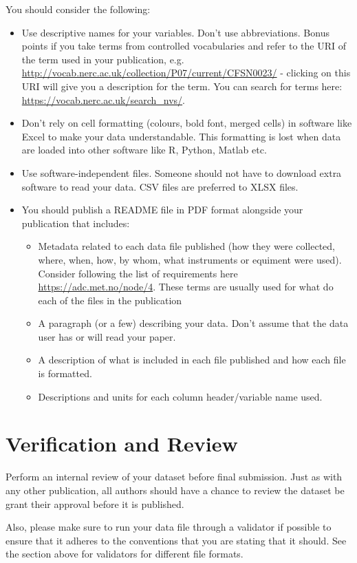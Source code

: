 \documentclass[a4paper,12pt]{article}
\begin{document}
You should consider the following:
\begin{itemize}
\item Use descriptive names for your variables. Don't use abbreviations. Bonus points if you take terms from controlled vocabularies and refer to the URI of the term used in your publication, e.g. \url{http://vocab.nerc.ac.uk/collection/P07/current/CFSN0023/} - clicking on this URI will give you a description for the term. You can search for terms here: \url{https://vocab.nerc.ac.uk/search_nvs/}.
\item Don't rely on cell formatting (colours, bold font, merged cells) in software like Excel to make your data understandable. This formatting is lost when data are loaded into other software like R, Python, Matlab etc.
\item Use software-independent files. Someone should not have to download extra software to read your data. CSV files are preferred to XLSX files.
\item You should publish a README file in PDF format alongside your publication that includes:
\begin{itemize}
\item Metadata related to each data file published (how they were collected, where, when, how, by whom, what instruments or equiment were used). Consider following the list of requirements here \url{https://adc.met.no/node/4}. These terms are usually used for  what do each of the files in the publication 
\item A paragraph (or a few) describing your data. Don't assume that the data user has or will read your paper.
\item A description of what is included in each file published and how each file is formatted.
\item Descriptions and units for each column header/variable name used.
\end{itemize} 
\end{itemize}

\section{Verification and Review}
\label{sec:verification-review}

Perform an internal review of your dataset before final submission. Just as with any other publication, all authors should have a chance to review the dataset be grant their approval before it is published.

Also, please make sure to run your data file through a validator if possible to ensure that it adheres to the conventions that you are stating that it should. See the section above for validators for different file formats.
\end{document}
